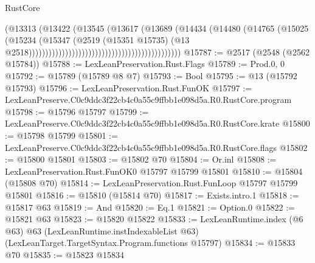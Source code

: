 \begin{lexlean}{RustCore}
\begin{coremodule}
                                                                      (@13313
                                                                        (@13422
                                                                          (@13545
                                                                            (@13617
                                                                              (@13689
                                                                                (@14434
                                                                                  (@14480
                                                                                    (@14765
                                                                                      (@15025
                                                                                        (@15234
                                                                                          (@15347
                                                                                            (@2519
                                                                                              (@15351
                                                                                                @15735)
                                                                                              (@13
                                                                                                @2518))))))))))))))))))))))))))))))))))))))))))))))
@15787 := @2517 (@2548 (@2562 @15784))
@15788 := LexLeanPreservation.Rust.Flags
@15789 := Prod.{0, 0}
@15792 := @15789 (@15789 @8 @7)
@15793 := Bool
@15795 := @13 (@15792 @15793)
@15796 := LexLeanPreservation.Rust.FunOK
@15797 := LexLeanPreserve.C0c9ddc3f22cb4c0a55c9ffbb1e098d5a.R0.RustCore.program
@15798 := @15796 @15797
@15799 := LexLeanPreserve.C0c9ddc3f22cb4c0a55c9ffbb1e098d5a.R0.RustCore.krate
@15800 := @15798 @15799
@15801 := LexLeanPreserve.C0c9ddc3f22cb4c0a55c9ffbb1e098d5a.R0.RustCore.flags
@15802 := @15800 @15801
@15803 := @15802 @70
@15804 := Or.inl
@15808 := LexLeanPreservation.Rust.FunOK0 @15797 @15799 @15801
@15810 := @15804 (@15808 @70)
@15814 := LexLeanPreservation.Rust.FunLoop @15797 @15799 @15801
@15816 := @15810 (@15814 @70)
@15817 := Exists.intro.{1}
@15818 := @15817 @63
@15819 := And
@15820 := Eq.{1}
@15821 := Option.{0}
@15822 := @15821 @63
@15823 := @15820 @15822
@15833 := LexLeanRuntime.index
    (@6 @63)
    @63
    (LexLeanRuntime.instIndexableList @63)
    (LexLeanTarget.TargetSyntax.Program.functions @15797)
@15834 := @15833 @70
@15835 := @15823 @15834

\end{coremodule}
\end{lexlean}
